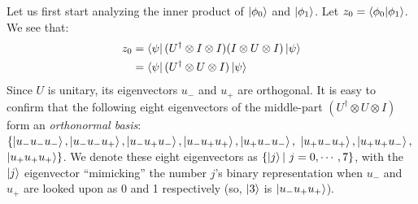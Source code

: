 \begin{prf}
Let us first start analyzing the inner product of $\ket{\phi_0}$ and $\ket{\phi_1}$. 
Let $z_0=\bra{\phi_0}\ket{\phi_1}$. We see that:
\begin{align*}
    z_0 & = \bra{\psi}(U^{\dagger} \otimes I \otimes I) (I \otimes U \otimes I)\ket{\psi} \\
        & = \bra{\psi}(U^{\dagger} \otimes U \otimes I) \ket{\psi}    
\end{align*}
Since $U$ is unitary, its eigenvectors $u_{-}$ and $u_{+}$ are orthogonal.
It is easy to confirm that the following eight eigenvectors of the middle-part $(U^{\dagger} \otimes U \otimes I)$ form an {\em orthonormal basis}: 
$\{\ket{u_{-}u_{-}u_{-}}, \ket{u_{-}u_{-}u_{+}}, \ket{u_{-}u_{+}u_{-}}, \ket{u_{-}u_{+}u_{+}}, \ket{u_{+}u_{-}u_{-}},$  $\ket{u_{+}u_{-}u_{+}}, \ket{u_{+}u_{+}u_{-}},$ \\$\ket{u_{+}u_{+}u_{+}}\}$. 
We denote these eight eigenvectors as $\{ \ket{j}  |\ j=0,\cdots,7\}$, with the $\ket{j}$ eigenvector ``mimicking'' the number $j$'s binary representation when $u_{-}$ and $u_{+}$ are looked upon as 0 and 1 respectively (so, $\ket{3}$ is 
$\ket{u_{-}u_{+}u_{+}}$).


\end{prf}
